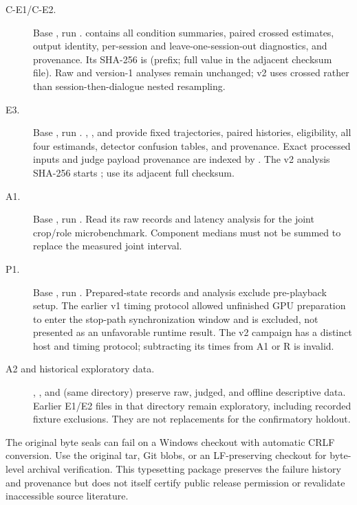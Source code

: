 \documentclass[12pt]{article}
\begin{document}
\begin{description}
\item[C-E1/C-E2.] Base , run .  contains all condition summaries, paired crossed estimates, output identity, per-session and leave-one-session-out diagnostics, and provenance. Its SHA-256 is  (prefix; full value in the adjacent checksum file). Raw and version-1 analyses remain unchanged; v2 uses crossed rather than session-then-dialogue nested resampling.
\item[E3.] Base , run . , , and  provide fixed trajectories, paired histories, eligibility, all four estimands, detector confusion tables, and provenance. Exact processed inputs and judge payload provenance are indexed by . The v2 analysis SHA-256 starts ; use its adjacent full checksum.
\item[A1.] Base , run . Read its raw records and latency analysis for the joint crop/role microbenchmark. Component medians must not be summed to replace the measured joint interval.
\item[P1.] Base , run . Prepared-state records and analysis exclude pre-playback setup. The earlier v1 timing protocol allowed unfinished GPU preparation to enter the stop-path synchronization window and is excluded, not presented as an unfavorable runtime result. The v2 campaign has a distinct host and timing protocol; subtracting its times from A1 or R is invalid.
\item[A2 and historical exploratory data.] , , and  (same directory) preserve raw, judged, and offline descriptive data. Earlier E1/E2 files in that directory remain exploratory, including recorded fixture exclusions. They are not replacements for the confirmatory holdout.
\end{description}

The original byte seals can fail on a Windows checkout with automatic CRLF conversion. Use the original tar, Git blobs, or an LF-preserving checkout for byte-level archival verification. This typesetting package preserves the failure history and provenance but does not itself certify public release permission or revalidate inaccessible source literature.
\end{document}

